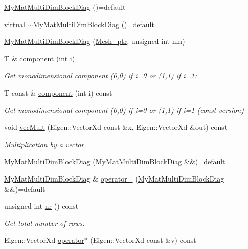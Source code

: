 \begin{DoxyCompactItemize}
\item 
\hyperlink{classTspeed_1_1MyMatMultiDimBlockDiag_afab5a0f9292e20682a092df2e23e4085}{My\-Mat\-Multi\-Dim\-Block\-Diag} ()=default
\item 
virtual \hyperlink{classTspeed_1_1MyMatMultiDimBlockDiag_a3571b43f213adf9d0a267cb0f51ffa17}{$\sim$\-My\-Mat\-Multi\-Dim\-Block\-Diag} ()=default
\item 
\hyperlink{classTspeed_1_1MyMatMultiDimBlockDiag_aced3b96e49bd12dfeb95f763fbd0757f}{My\-Mat\-Multi\-Dim\-Block\-Diag} (\hyperlink{namespaceTspeed_a7367a01365c4cc2c1a09305b3effc4e8}{Mesh\-\_\-ptr}, unsigned int nln)
\item 
T \& \hyperlink{classTspeed_1_1MyMatMultiDimBlockDiag_aa430ef9d18b0a68c4bff63047daf0be9}{component} (int i)
\begin{DoxyCompactList}\small\item\em Get monodimensional component (0,0) if i=0 or (1,1) if i=1\-: \end{DoxyCompactList}\item 
T const \& \hyperlink{classTspeed_1_1MyMatMultiDimBlockDiag_a5f813a4f7c0a080cb5e1808941ef7348}{component} (int i) const 
\begin{DoxyCompactList}\small\item\em Get monodimensional component (0,0) if i=0 or (1,1) if i=1 (const version) \end{DoxyCompactList}\item 
void \hyperlink{classTspeed_1_1MyMatMultiDimBlockDiag_a506cb7bfc917b4a443deb9f5e6409cf7}{vec\-Mult} (Eigen\-::\-Vector\-Xd const \&x, Eigen\-::\-Vector\-Xd \&out) const 
\begin{DoxyCompactList}\small\item\em Multiplication by a vector. \end{DoxyCompactList}\item 
\hyperlink{classTspeed_1_1MyMatMultiDimBlockDiag_a64aee8deb9a8477c247778c033dd54c0}{My\-Mat\-Multi\-Dim\-Block\-Diag} (\hyperlink{classTspeed_1_1MyMatMultiDimBlockDiag}{My\-Mat\-Multi\-Dim\-Block\-Diag} \&\&)=default
\item 
\hyperlink{classTspeed_1_1MyMatMultiDimBlockDiag}{My\-Mat\-Multi\-Dim\-Block\-Diag} \& \hyperlink{classTspeed_1_1MyMatMultiDimBlockDiag_a2cecd6795a391ecbf1853f8af8926277}{operator=} (\hyperlink{classTspeed_1_1MyMatMultiDimBlockDiag}{My\-Mat\-Multi\-Dim\-Block\-Diag} \&\&)=default
\item 
unsigned int \hyperlink{classTspeed_1_1MyMatMultiDimBlockDiag_a5016da7b2a0ff6099353ddd91f960dd7}{nr} () const 
\begin{DoxyCompactList}\small\item\em Get total number of rows. \end{DoxyCompactList}\item 
Eigen\-::\-Vector\-Xd \hyperlink{classTspeed_1_1MyMatMultiDimBlockDiag_ae688f7b76e7da9686a74bed5d0f059c7}{operator$\ast$} (Eigen\-::\-Vector\-Xd const \&v) const 
\end{DoxyCompactItemize}
